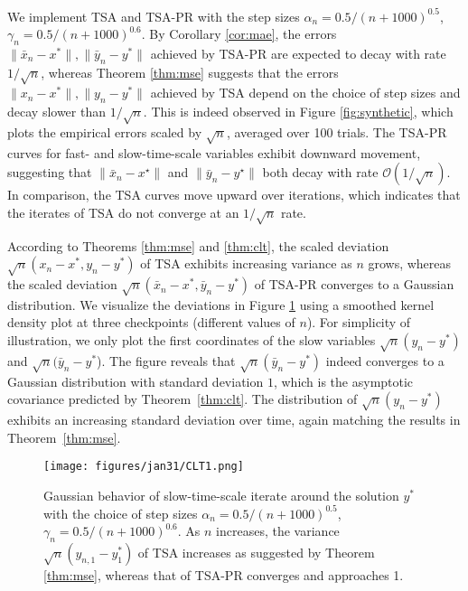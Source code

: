We implement TSA and TSA-PR with the step sizes $\alpha_n=0.5/(n+1000)^{0.5}$, $\gamma_n=0.5/(n+1000)^{0.6}$.
By Corollary \ref{cor:mae}, the errors $\lVert \bar{x}_n - x^*\rVert,\lVert \bar{y}_n - y^*\rVert$ achieved by TSA-PR are expected to decay with rate $1/\sqrt{n}$, whereas Theorem \ref{thm:mse} suggests that the errors $\lVert x_n - x^*\rVert,\lVert y_n - y^*\rVert$ achieved by TSA depend on the choice of step sizes and decay slower than $1/\sqrt{n}$. This is indeed observed in Figure \ref{fig:synthetic}, which plots the empirical errors scaled by $\sqrt{n}$, averaged over 100 trials. 
The TSA-PR curves for fast- and slow-time-scale variables exhibit downward movement, suggesting that $\|\bar{x}_n-x^{\star}\|$ and $\|\bar{y}_n-y^{\star}\|$ both decay with rate $\mathcal{O}(1/\sqrt{n})$. In comparison, the TSA curves move upward over iterations, which indicates that the iterates of TSA do not converge at an $1/\sqrt{n}$ rate.




According to Theorems \ref{thm:mse} and \ref{thm:clt}, the scaled deviation $\sqrt{n} (x_n-x^*, y_n-y^*)$ of TSA exhibits increasing variance as $n$ grows, whereas the scaled deviation $\sqrt{n} (\bar{x}_n-x^*, \bar{y}_n-y^*)$ of TSA-PR converges to a Gaussian distribution.
We visualize the deviations in Figure \ref{fig:clt} using a smoothed kernel density plot at three checkpoints (different values of $n$). 
For simplicity of illustration, we only plot the first coordinates of the slow variables $\sqrt{n}(y_n - y^*)$ and $\sqrt{n}(\bar{y}_n - y^*$). 
The figure reveals that $\sqrt{n} (\bar{y}_n-y^*)$ indeed converges to a Gaussian distribution with standard deviation $1$, which is the asymptotic covariance predicted by Theorem~\ref{thm:clt}. The distribution of $\sqrt{n} (y_n-y^*)$ exhibits an increasing standard deviation over time, again matching the results in Theorem~\ref{thm:mse}.



\begin{figure}[thbp]
    \centering
    \begin{minipage}[t]{\textwidth}
        \centering
        \texttt{[image: figures/jan31/CLT1.png]}
    \end{minipage}
    \vspace{-22pt}
    \caption{
        Gaussian behavior of slow-time-scale iterate around the solution $y^*$ with the choice of step sizes $\alpha_n=0.5/(n+1000)^{0.5}$, $\gamma_n=0.5/(n+1000)^{0.6}$.         
        As $n$ increases, the variance $\sqrt{n}(y_{n,1} - y_1^*)$ of TSA increases as suggested by Theorem \ref{thm:mse}, whereas that of TSA-PR converges and approaches 1.
        }
    \label{fig:clt}
\end{figure}


